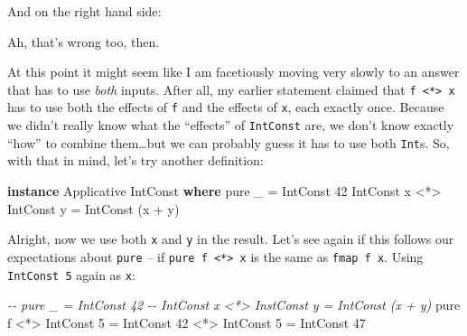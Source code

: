 \documentclass[]{article}
\newenvironment{Shaded}{}{}
\newcommand{\CommentTok}[1]{\textcolor[rgb]{0.38,0.63,0.69}{\textit{#1}}}
\newcommand{\DataTypeTok}[1]{\textcolor[rgb]{0.56,0.13,0.00}{#1}}
\newcommand{\DecValTok}[1]{\textcolor[rgb]{0.25,0.63,0.44}{#1}}
\newcommand{\FunctionTok}[1]{\textcolor[rgb]{0.02,0.16,0.49}{#1}}
\newcommand{\KeywordTok}[1]{\textcolor[rgb]{0.00,0.44,0.13}{\textbf{#1}}}
\newcommand{\NormalTok}[1]{#1}
\newcommand{\OperatorTok}[1]{\textcolor[rgb]{0.40,0.40,0.40}{#1}}
\newcommand{\OtherTok}[1]{\textcolor[rgb]{0.00,0.44,0.13}{#1}}
\begin{document}
And on the right hand side:

\begin{Shaded}
\end{Shaded}

Ah, that's wrong too, then.

At this point it might seem like I am facetiously moving very slowly to an
answer that has to use \emph{both} inputs. After all, my earlier statement
claimed that \texttt{f\ \textless{}*\textgreater{}\ x} has to use both the
effects of \texttt{f} and the effects of \texttt{x}, each exactly once. Because
we didn't really know what the ``effects'' of \texttt{IntConst} are, we don't
know exactly ``how'' to combine them\ldots but we can probably guess it has to
use both \texttt{Int}s. So, with that in mind, let's try another definition:

\begin{Shaded}
\begin{Highlighting}[]
\KeywordTok{instance} \DataTypeTok{Applicative} \DataTypeTok{IntConst} \KeywordTok{where}
    \FunctionTok{pure}\NormalTok{ \_                    }\OtherTok{=} \DataTypeTok{IntConst} \DecValTok{42}
    \DataTypeTok{IntConst}\NormalTok{ x }\OperatorTok{<*>} \DataTypeTok{IntConst}\NormalTok{ y }\OtherTok{=} \DataTypeTok{IntConst}\NormalTok{ (x }\OperatorTok{+}\NormalTok{ y)}
\end{Highlighting}
\end{Shaded}

Alright, now we use both \texttt{x} and \texttt{y} in the result. Let's see
again if this follows our expectations about \texttt{pure} -- if
\texttt{pure\ f\ \textless{}*\textgreater{}\ x} is the same as
\texttt{fmap\ f\ x}. Using \texttt{IntConst\ 5} again as \texttt{x}:

\begin{Shaded}
\begin{Highlighting}[]
\CommentTok{{-}{-} pure \_                     = IntConst 42}
\CommentTok{{-}{-} IntConst x <*> InstConst y = IntConst (x + y)}
\FunctionTok{pure}\NormalTok{ f }\OperatorTok{<*>} \DataTypeTok{IntConst} \DecValTok{5} \OtherTok{=} \DataTypeTok{IntConst} \DecValTok{42} \OperatorTok{<*>} \DataTypeTok{IntConst} \DecValTok{5}
                      \OtherTok{=} \DataTypeTok{IntConst} \DecValTok{47}
\end{Highlighting}
\end{Shaded}
\end{document}
